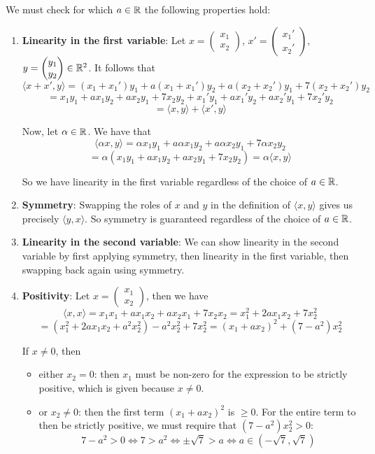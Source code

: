 \documentclass[12pt]{article}
\begin{document}
We must check for which $a \in \mathbb{R}$ the following properties hold:
\begin{enumerate}
    \item \textbf{Linearity in the first variable}: Let $x = \begin{pmatrix} x_1 \\ x_2 \end{pmatrix}$, $x' = \begin{pmatrix} x_1' \\ x_2' \end{pmatrix}$, $y = \begin{pmatrix} y_1 \\ y_2 \end{pmatrix} \in \mathbb{R}^2$. It follows that
    $$
        \langle x + x', y \rangle = (x_1 + x_1')y_1 + a(x_1 + x_1')y_2 + a(x_2 + x_2')y_1 + 7(x_2 + x_2')y_2
    $$
    $$
        = x_1y_1 +ax_1y_2 + ax_2y_1 + 7x_2y_2 + x_1'y_1 +ax_1'y_2 + ax_2'y_1 + 7x_2'y_2
    $$
    $$
        = \langle x, y \rangle + \langle x', y \rangle
    $$

    Now, let $\alpha \in \mathbb{R}$. We have that
    $$
        \langle \alpha x, y \rangle = \alpha x_1y_1 + a\alpha x_1y_2 + a\alpha x_2y_1 + 7\alpha x_2y_2
    $$
    $$
        = \alpha (x_1y_1 + ax_1y_2 + ax_2y_1 + 7x_2y_2) = \alpha \langle x, y \rangle
    $$

    So we have linearity in the first variable regardless of the choice of $a \in \mathbb{R}$.

    \item \textbf{Symmetry}: Swapping the roles of $x$ and $y$ in the definition of $\langle x, y \rangle$ gives us precisely $\langle y, x \rangle$. So symmetry is guaranteed regardless of the choice of $a \in \mathbb{R}$.
    \item \textbf{Linearity in the second variable}: We can show linearity in the second variable by first applying symmetry, then linearity in the first variable, then swapping back again using symmetry.
    \item \textbf{Positivity}: Let $x = \begin{pmatrix} x_1 \\ x_2 \end{pmatrix}$, then we have
    $$
        \langle x, x \rangle = x_1x_1 + ax_1x_2 + ax_2x_1 + 7x_2x_2 = x_1^2 + 2ax_1x_2 + 7x_2^2
    $$
    $$
        = (x_1^2 + 2ax_1x_2 + a^2x_2^2) - a^2x_2^2 + 7x_2^2 = (x_1 + ax_2)^2 + (7-a^2) x_2^2
    $$

    If $x \neq 0$, then
    \begin{itemize}
        \item either $x_2 = 0$: then $x_1$ must be non-zero for the expression to be strictly positive, which is given because $x \neq 0$.
        \item or $x_2 \neq 0$: then the first term $(x_1 + ax_2)^2$ is $\geq 0$. For the entire term to then be strictly positive, we must require that $(7-a^2)x_2^2 > 0$:
            $$
                7 - a^2 > 0 \iff 7 > a^2 \iff \pm \sqrt{7} > a \iff a \in (-\sqrt{7}, \sqrt{7})
            $$
    \end{itemize}
\end{enumerate}
\end{document}
